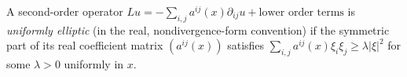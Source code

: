 
A second-order operator $Lu=-\sum_{i,j}a^{ij}(x)\partial_{ij}u+\text{lower order terms}$ is \emph{uniformly elliptic} (in the real, nondivergence-form convention) if the symmetric part of its real coefficient matrix $(a^{ij}(x))$ satisfies $\sum_{i,j}a^{ij}(x)\xi_i\xi_j\ge\lambda|\xi|^2$ for some $\lambda>0$ uniformly in $x$.

